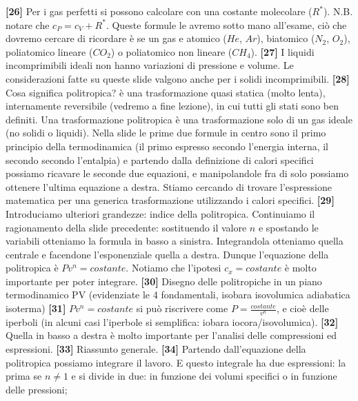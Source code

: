 \newline\textbf{[26]}\; Per i gas perfetti si possono calcolare con una costante molecolare ($R^*$). N.B. notare che $c_P = c_V + R^*$. Queste formule le avremo sotto mano all'esame, ciò che dovremo cercare di ricordare è se un gas e atomico ($He$, $Ar$), biatomico ($N_2$, $O_2$), poliatomico lineare ($CO_2$) o poliatomico non lineare ($CH_4$).
\newline\textbf{[27]}\; I liquidi incomprimibili ideali non hanno variazioni di pressione e volume. Le considerazioni fatte su queste slide valgono anche per i solidi incomprimibili.
\newline\textbf{[28]}\; Cosa significa politropica? è una trasformazione quasi statica (molto lenta), internamente reversibile (vedremo a fine lezione), in cui tutti gli stati sono ben definiti. Una trasformazione politropica è una trasformazione solo di un gas ideale (no solidi o liquidi). Nella slide le prime due formule in centro sono il primo principio della termodinamica (il primo espresso secondo l'energia interna, il secondo secondo l'entalpia) e partendo dalla definizione di calori specifici possiamo ricavare le seconde due equazioni, e manipolandole fra di solo possiamo ottenere l'ultima equazione a destra. Stiamo cercando di trovare l'espressione matematica per una generica trasformazione utilizzando i calori specifici.  
\newline\textbf{[29]}\; Introduciamo ulteriori grandezze: indice della politropica. Continuiamo il ragionamento della slide precedente: sostituendo il valore $n$ e spostando le variabili otteniamo la formula in basso a sinistra. Integrandola otteniamo quella centrale e facendone l'esponenziale quella a destra. Dunque l'equazione della politropica è $Pv^n = costante$. Notiamo che l'ipotesi $c_x = costante$ è molto importante per poter integrare.
\newline\textbf{[30]}\; Disegno delle politropiche in un piano termodinamico PV (evidenziate le 4 fondamentali, isobara isovolumica adiabatica isoterma)
\newline\textbf{[31]}\; $Pv^n = costante$ si può riscrivere come $P = \frac{costante}{v^n}$, e cioè delle iperboli (in alcuni casi l'iperbole si semplifica: iobara iocora/isovolumica).
\newline\textbf{[32]}\; Quella in basso a destra è molto importante per l'analisi delle compressioni ed espressioni.
\newline\textbf{[33]}\; Riassunto generale.
\newline\textbf{[34]}\; Partendo dall'equazione della politropica possiamo integrare il lavoro. E questo integrale ha due espressioni: la prima se $n \neq 1$ e si divide in due: in funzione dei volumi specifici o in funzione delle pressioni;
